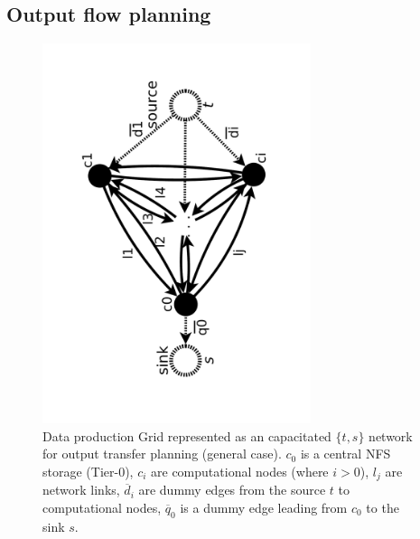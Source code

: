 \documentclass[english]{ddny}
\begin{document}
\subsection{Output flow planning}
\label{outproblem}
\begin{figure}[h]
	\begin{center}
		\includegraphics [trim= 30mm 20mm 30mm 30mm , clip, angle =-90, width=0.7\textwidth]{pic/network_general_out.pdf}
	\end{center}
	\caption{Data production Grid represented as an capacitated $\{t,s\}$ network for output transfer planning (general case). $c_{0}$ is a central NFS storage (Tier-0), $c_{i}$ are computational nodes (where $i>0$), $l_{j}$ are network links, $\overline{d}_{i}$ are dummy edges from the source $t$ to computational nodes, $\overline{q}_{0}$ is a dummy edge leading from $c_{0}$ to the sink $s$. }
	\label{general_out}	
\end{figure}
\end{document}
